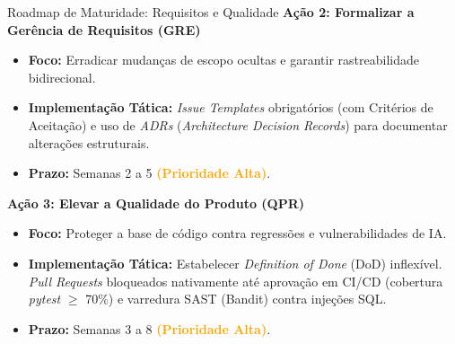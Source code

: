 \documentclass[10pt, aspectratio=169]{beamer}
\begin{document}
\begin{frame}{Roadmap de Maturidade: Requisitos e Qualidade}
    \textbf{Ação 2: Formalizar a Gerência de Requisitos (GRE)}
    \begin{itemize}
        \item \textbf{Foco:} Erradicar mudanças de escopo ocultas e garantir rastreabilidade bidirecional.
        \item \textbf{Implementação Tática:} \textit{Issue Templates} obrigatórios (com Critérios de Aceitação) e uso de \textit{ADRs} (\textit{Architecture Decision Records}) para documentar alterações estruturais.
        \item \textbf{Prazo:} Semanas 2 a 5 \textcolor{orange}{\textbf{(Prioridade Alta)}}.
    \end{itemize}
    \vspace{0.3cm}

    \textbf{Ação 3: Elevar a Qualidade do Produto (QPR)}
    \begin{itemize}
        \item \textbf{Foco:} Proteger a base de código contra regressões e vulnerabilidades de IA.
        \item \textbf{Implementação Tática:} Estabelecer \textit{Definition of Done} (DoD) inflexível. \textit{Pull Requests} bloqueados nativamente até aprovação em CI/CD (cobertura \textit{pytest} $\ge$ 70\%) e varredura SAST (Bandit) contra injeções SQL.
        \item \textbf{Prazo:} Semanas 3 a 8 \textcolor{orange}{\textbf{(Prioridade Alta)}}.
    \end{itemize}
\end{frame}
\end{document}
